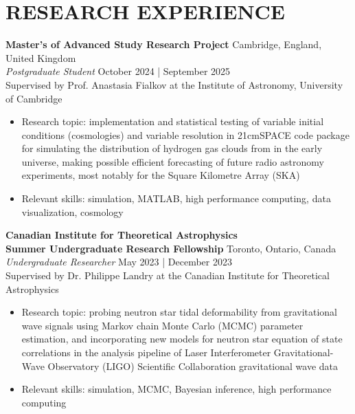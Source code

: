 \documentclass[a4paper,10pt]{extarticle}
\begin{document}
\section*{RESEARCH EXPERIENCE}
\textbf{Master's of Advanced Study Research Project} \hfill Cambridge, England, United Kingdom\\
\textit{Postgraduate Student} \hfill October 2024 | September 2025\\
Supervised by Prof. Anastasia Fialkov at the Institute of Astronomy, University of Cambridge
\begin{itemize}
    \item Research topic: implementation and statistical testing of variable initial conditions (cosmologies) and variable resolution in 21cmSPACE code package for simulating the distribution of hydrogen gas clouds from in the early universe, making possible efficient forecasting of future radio astronomy experiments, most notably for the Square Kilometre Array (SKA)
    
    \item Relevant skills: simulation, MATLAB, high performance computing, data visualization, cosmology
\end{itemize}

\textbf{Canadian Institute for Theoretical Astrophysics\\
    Summer Undergraduate Research Fellowship} \hfill Toronto, Ontario, Canada\\
\textit{Undergraduate Researcher} \hfill May 2023 | December 2023\\
Supervised by Dr. Philippe Landry at the Canadian Institute for Theoretical Astrophysics
\begin{itemize}
    \item Research topic: probing neutron star tidal deformability from gravitational wave signals using Markov chain Monte Carlo (MCMC) parameter estimation, and incorporating new models for neutron star equation of state correlations in the analysis pipeline of Laser Interferometer Gravitational-Wave Observatory (LIGO) Scientific Collaboration gravitational wave data

    \item Relevant skills: simulation, MCMC, Bayesian inference, high performance computing
\end{itemize}
\end{document}
